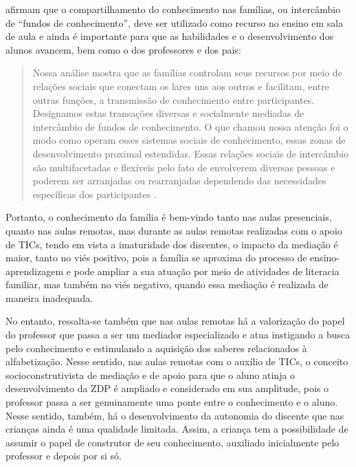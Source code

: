 \documentclass{textolivre}
\begin{document}
\textcite[p. 31]{moll1990} afirmam que o compartilhamento do conhecimento nas famílias, ou intercâmbio de “fundos de conhecimento”,  deve ser utilizado como recurso no ensino em sala de aula e ainda é importante para que as habilidades e o desenvolvimento dos alunos avancem, bem como o dos professores e dos pais:

\begin{quote}
Nossa análise mostra que as famílias controlam seus recursos por meio de relações sociais que conectam os lares uns aos outros e facilitam, entre outras funções, a transmissão de conhecimento entre participantes. Designamos estas transações diversas e socialmente mediadas de intercâmbio de fundos de conhecimento. O que chamou nossa atenção foi o modo como operam esses sistemas sociais de conhecimento, essas zonas de desenvolvimento proximal estendidas. Essas relações sociais de intercâmbio são multifacetadas e flexíveis pelo fato de envolverem diversas pessoas e poderem ser arranjadas ou rearranjadas dependendo das necessidades específicas dos participantes \cite[p. 31-32]{moll1990}.
\end{quote}

Portanto, o conhecimento da família é bem-vindo tanto nas aulas presenciais, quanto nas aulas remotas, mas durante as aulas remotas realizadas com o apoio de TICs, tendo em vista a imaturidade dos discentes, o impacto da mediação é maior, tanto no viés positivo, pois a família se aproxima do processo de ensino-aprendizagem e pode ampliar a sua atuação por meio de atividades de literacia familiar, mas também no viés negativo, quando essa mediação é realizada de maneira inadequada.

No entanto, ressalta-se também que nas aulas remotas há a valorização do papel do professor que passa a ser um mediador especializado e atua instigando a busca pelo conhecimento e estimulando a aquisição dos saberes relacionados à alfabetização. Nesse sentido, nas aulas remotas com o auxílio de TICs, o conceito socioconstrutivista de mediação e de apoio para que o aluno atinja o desenvolvimento da ZDP é ampliado e considerado em sua amplitude, pois o professor passa a ser genuinamente uma ponte entre o conhecimento e o aluno. Nesse sentido, também, há o desenvolvimento da autonomia do discente que nas crianças ainda é uma qualidade limitada. Assim, a criança tem a possibilidade de assumir o papel de construtor de seu conhecimento, auxiliado inicialmente pelo professor e depois por si só.
\end{document}
